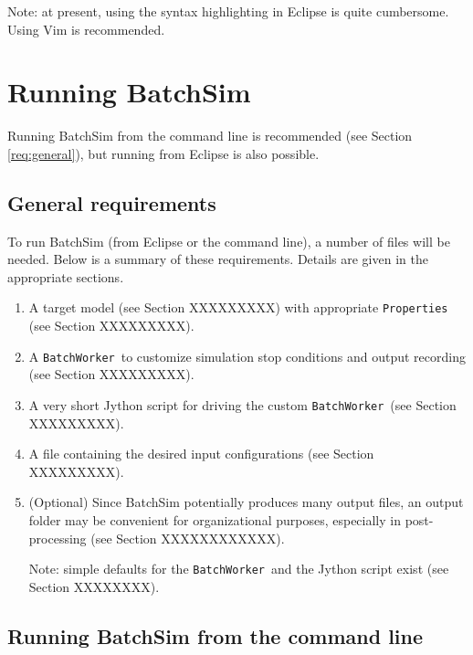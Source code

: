 \documentclass{article}
\newcommand{\BW}{{\tt BatchWorker}}
\begin{document}
\begin{sideblock}
Note: at present, using the syntax highlighting in Eclipse is quite cumbersome. Using Vim is recommended.
\end{sideblock}

\section{Running BatchSim}

Running BatchSim from the command line is recommended (see Section \ref{req:general}), but running from Eclipse is also possible.

\subsection{General requirements}

To run BatchSim (from Eclipse or the command line), a number of files will be needed. Below is a summary of these requirements. Details are given in the appropriate sections.

\begin{enumerate}

\item A target model (see Section XXXXXXXXX) with appropriate {\tt Properties} (see Section XXXXXXXXX).

\item A \BW\ to customize simulation stop conditions and output recording (see Section XXXXXXXXX).

\item A very short Jython script for driving the custom \BW\ (see Section XXXXXXXXX).

\item A file containing the desired input configurations (see Section XXXXXXXXX).

\item (Optional) Since BatchSim potentially produces many output files, an output folder may be convenient for organizational purposes, especially in post-processing (see Section XXXXXXXXXXXX).

\begin{sideblock}
Note: simple defaults for the \BW\ and the Jython script exist (see Section XXXXXXXX).
\end{sideblock}

\end{enumerate}

\subsection{Running BatchSim from the command line}
\end{document}
